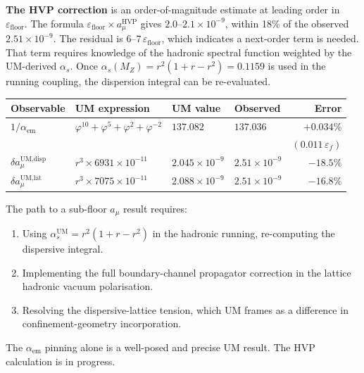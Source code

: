 \documentclass[12pt]{article}
\begin{document}
\textbf{The HVP correction} is an order-of-magnitude estimate at
leading order in $\varepsilon_{\text{floor}}$. The formula
$\varepsilon_{\text{floor}} \times a_\mu^{\text{HVP}}$ gives
$2.0\text{--}2.1 \times 10^{-9}$, within 18\% of the observed
$2.51 \times 10^{-9}$. The residual is $6\text{--}7\,\varepsilon_{\text{floor}}$,
which indicates a next-order term is needed. That term requires
knowledge of the hadronic spectral function weighted by the
UM-derived $\alpha_s$. Once $\alpha_s(M_Z) = r^2(1+r-r^2) = 0.1159$
is used in the running coupling, the dispersion integral can be
re-evaluated.

\begin{center}
\begin{tabular}{llllr}
\toprule
Observable & UM expression & UM value & Observed & Error \\
\midrule
$1/\alpha_{\text{em}}$
  & $\varphi^{10}{+}\varphi^5{+}\varphi^2{+}\varphi^{-2}$
  & $137.082$ & $137.036$ & $+0.034\%$ \\
  &            &           &           & $(0.011\,\varepsilon_f)$ \\[2pt]
$\delta a_\mu^{\text{UM,disp}}$
  & $r^3 \times 6931 \times 10^{-11}$
  & $2.045 \times 10^{-9}$ & $2.51 \times 10^{-9}$ & $-18.5\%$ \\[2pt]
$\delta a_\mu^{\text{UM,lat}}$
  & $r^3 \times 7075 \times 10^{-11}$
  & $2.088 \times 10^{-9}$ & $2.51 \times 10^{-9}$ & $-16.8\%$ \\
\bottomrule
\end{tabular}
\end{center}

The path to a sub-floor $a_\mu$ result requires:
\begin{enumerate}
  \item Using $\alpha_s^{\text{UM}} = r^2(1+r-r^2)$ in the
    hadronic running, re-computing the dispersive integral.
  \item Implementing the full boundary-channel propagator correction
    in the lattice hadronic vacuum polarisation.
  \item Resolving the dispersive-lattice tension, which UM frames as
    a difference in confinement-geometry incorporation.
\end{enumerate}

The $\alpha_{\text{em}}$ pinning alone is a well-posed and precise UM
result. The HVP calculation is in progress.
\end{document}
